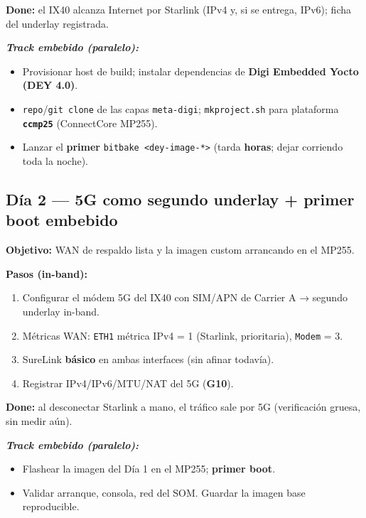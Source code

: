 \documentclass[11pt,a4paper]{article}
\newcommand{\file}[1]{\texttt{#1}}
\newcommand{\gate}[1]{\textbf{G#1}}
\newcommand{\done}{\textbf{Done:}}
\newcommand{\embebido}{\textit{Track embebido (paralelo):}}
\begin{document}
\begin{clave}
\small
\done{} el IX40 alcanza Internet por Starlink (IPv4 y, si se entrega, IPv6);
ficha del underlay registrada.
\end{clave}

\textbf{\embebido}
\begin{itemize}
  \item Provisionar host de build; instalar dependencias de \textbf{Digi Embedded Yocto (DEY 4.0)}.
  \item \file{repo}/\file{git clone} de las capas \file{meta-digi}; \file{mkproject.sh}
        para plataforma \textbf{\file{ccmp25}} (ConnectCore MP255).
  \item Lanzar el \textbf{primer} \file{bitbake <dey-image-*>} (tarda \textbf{horas};
        dejar corriendo toda la noche).
\end{itemize}

\subsection{Día 2 — 5G como segundo underlay + primer boot embebido}

\textbf{Objetivo:} WAN de respaldo lista y la imagen custom arrancando en el MP255.

\textbf{Pasos (in-band):}
\begin{enumerate}
  \item Configurar el módem 5G del IX40 con SIM/APN de Carrier A → segundo underlay in-band.
  \item Métricas WAN: \file{ETH1} métrica IPv4 = 1 (Starlink, prioritaria), \file{Modem} = 3.
  \item SureLink \textbf{básico} en ambas interfaces (sin afinar todavía).
  \item Registrar IPv4/IPv6/MTU/NAT del 5G (\textbf{\gate{10}}).
\end{enumerate}

\begin{clave}
\small
\done{} al desconectar Starlink a mano, el tráfico sale por 5G (verificación gruesa,
sin medir aún).
\end{clave}

\textbf{\embebido}
\begin{itemize}
  \item Flashear la imagen del Día 1 en el MP255; \textbf{primer boot}.
  \item Validar arranque, consola, red del SOM. Guardar la imagen base reproducible.
\end{itemize}
\end{document}

